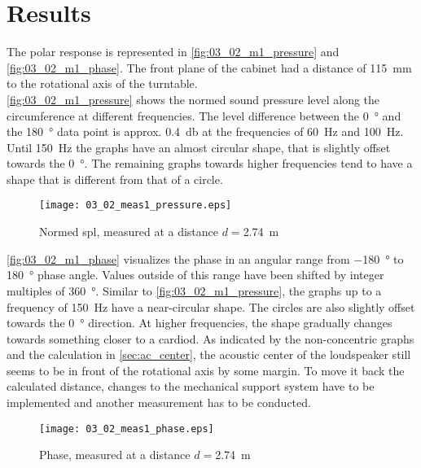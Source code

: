 \section*{Results}\label{sec:03_02_results}
The polar response is represented in \autoref{fig:03_02_m1_pressure} and \autoref{fig:03_02_m1_phase}. The front plane of the cabinet had a distance of \SI{115}{\milli\meter} to the rotational axis of the turntable.\\
\autoref{fig:03_02_m1_pressure} shows the normed sound pressure level  along the circumference at different frequencies. The level difference  between the \SI{0}{\degree} and the \SI{180}{\degree} data point is approx. \SI{0.4}{\decibel} at the frequencies of \SI{60}{\hertz} and \SI{100}{\hertz}. Until \SI{150}{\hertz} the graphs have an almost circular shape, that is slightly offset towards the \SI{0}{\degree}. The remaining graphs towards higher frequencies tend to have a shape that is different from that of a circle.
\begin{figure}[htbp]
	\centering
	\texttt{[image: 03\_02\_meas1\_pressure.eps]}
	\caption{Normed \gls{spl}, measured at a distance \(d=\)\SI{2.74}{\meter}}
		\label{fig:03_02_m1_pressure}
\end{figure}
\autoref{fig:03_02_m1_phase} visualizes the phase in an angular range from \SI{-180}{\degree} to \SI{180}{\degree} phase angle. Values outside of this range have been shifted by integer multiples of \SI{360}{\degree}. Similar to \autoref{fig:03_02_m1_pressure}, the graphs up to a  frequency of \SI{150}{\hertz} have a near-circular shape. The circles are also slightly offset towards the \SI{0}{\degree} direction. At higher frequencies, the shape gradually changes towards something closer to a cardiod.
As indicated  by the non-concentric graphs and the calculation in \autoref{sec:ac_center}, the acoustic center of the loudspeaker still seems to be in front of the rotational axis by some margin. To move it back the calculated distance, changes to the mechanical support system have to be implemented and another measurement has to be conducted.
\begin{figure}[htbp]
	\centering
	\texttt{[image: 03\_02\_meas1\_phase.eps]}
	\caption{Phase, measured at a distance \(d=\)\SI{2.74}{\meter}}
		\label{fig:03_02_m1_phase}
\end{figure}


